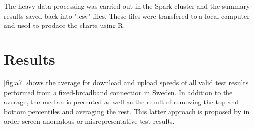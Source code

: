 \documentclass[12pt]{article}
\begin{document}
The heavy data processing was carried out in the Spark cluster and the summary results saved back into ".csv" files. These files were transfered to a local computer and used to produce the charts using R. 

\section{Results} \label{res}
\autoref{fig:a7} shows the average for download and upload speeds of all valid test results performed from a fixed-broadband connection in Sweden. In addition to the average, the median is presented as well as the result of removing the top and bottom percentiles and averaging the rest. This latter approach is proposed by \cite{samknows2013} in order screen anomalous or misrepresentative test results. 
\end{document}
